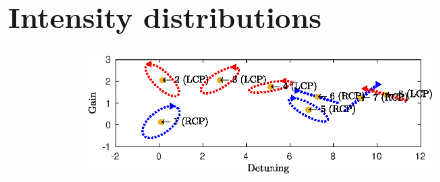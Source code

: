 \chapter{Intensity distributions}
\label{chap:intensities}

\begin{figure}
	\centering
	\begin{subfigure}{\linewidth}
		\includegraphics[width=\linewidth]{plots/defect/modes_found_oseen}
		\caption{}
	\end{subfigure}
	\begin{subfigure}{\linewidth}

\end{subfigure}
\end{figure}
